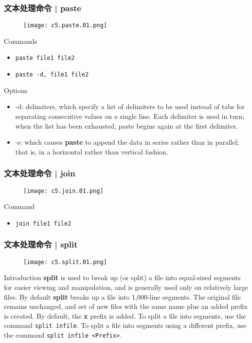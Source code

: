\begin{frame}[fragile]
  \frametitle{文本处理命令 | paste}
  \begin{figure}
    \centering
    \texttt{[image: c5.paste.01.png]}
  \end{figure}
  \pause
  \begin{block}{Commands}
    \begin{itemize}
      \item \verb|paste file1 file2|
      \item \verb|paste -d, file1 file2|
    \end{itemize}
  \end{block}
  \pause
  \begin{block}{Options}
    {\scriptsize
    \begin{itemize}
      \item -d: delimiters, which specify a list of delimiters to be used instead of tabs for separating consecutive values on a single line. Each delimiter is used in turn; when the list has been exhausted, paste begins again at the first delimiter.
      \item -s: which causes \textbf{paste} to append the data in series rather than in parallel; that is, in a horizontal rather than vertical fashion.
    \end{itemize}
    }
  \end{block}
\end{frame}

\begin{frame}[fragile]
  \frametitle{文本处理命令 | join}
  \begin{figure}
    \centering
    \texttt{[image: c5.join.01.png]}
  \end{figure}
  \pause
  \begin{block}{Command}
    \begin{itemize}
      \item \verb|join file1 file2|
    \end{itemize}
  \end{block}
\end{frame}

\begin{frame}[fragile]
  \frametitle{文本处理命令 | split}
  \begin{figure}
    \centering
    \texttt{[image: c5.split.01.png]}
  \end{figure}
  \pause
  \vspace{-0.3cm}
  \begin{block}{Introduction}
    {\footnotesize\textbf{split} is used to break up (or split) a file into equal-sized segments for easier viewing and manipulation, and is generally used only on relatively large files. By default \textbf{split} breaks up a file into 1,000-line segments. The original file remains unchanged, and set of new files with the same name plus an added prefix is created. By default, the \textbf{x} prefix is added. To split a file into segments, use the command \verb|split infile|. To split a file into segments using a different prefix, use the command \verb|split infile <Prefix>|.}
  \end{block}
\end{frame}

